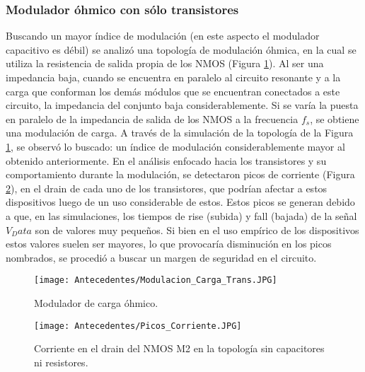 \subsubsection{Modulador óhmico con sólo transistores}
Buscando un mayor índice de modulación (en
este aspecto el modulador capacitivo es débil)
se analizó una topología de modulación óhmica,
en la cual se utiliza la resistencia de salida
propia de los NMOS (Figura \ref{fig:Mod_carg_trans}). 
Al ser
una impedancia baja, cuando se encuentra en
paralelo al circuito resonante y a la carga que
conforman los demás módulos que se encuentran
conectados a este circuito, la impedancia
del conjunto baja considerablemente. Si se varía 
la puesta en paralelo de la impedancia de
salida de los NMOS a la frecuencia $f_s$, se obtiene
una modulación de carga.
A través de la simulación de la topología de
la Figura \ref{fig:Mod_carg_trans}, se observó lo buscado: un índice
de modulación considerablemente mayor al
obtenido anteriormente. En el análisis enfocado
hacia los transistores y su comportamiento
durante la modulación, se detectaron picos
de corriente (Figura \ref{fig:Picos_Cor}), en el drain
de cada uno de los transistores, que podrían
afectar a estos dispositivos luego de un uso
considerable de estos. Estos picos se generan
debido a que, en las simulaciones, los tiempos
de rise (subida) y fall (bajada) de la señal
$V_Data$ son de valores muy pequeños. Si bien
en el uso empírico de los dispositivos estos
valores suelen ser mayores, lo que provocaría
disminución en los picos nombrados, se procedió
a buscar un margen de seguridad en el circuito.
\begin{figure}[H]
\centering
\texttt{[image: Antecedentes/Modulacion\_Carga\_Trans.JPG]}
\caption{Modulador de carga óhmico.}
\label{fig:Mod_carg_trans}
\end{figure}

\begin{figure}[H]
\centering
\texttt{[image: Antecedentes/Picos\_Corriente.JPG]}
\caption{Corriente en el drain del NMOS M2 en la topología sin capacitores ni resistores.}
\label{fig:Picos_Cor}
\end{figure}


